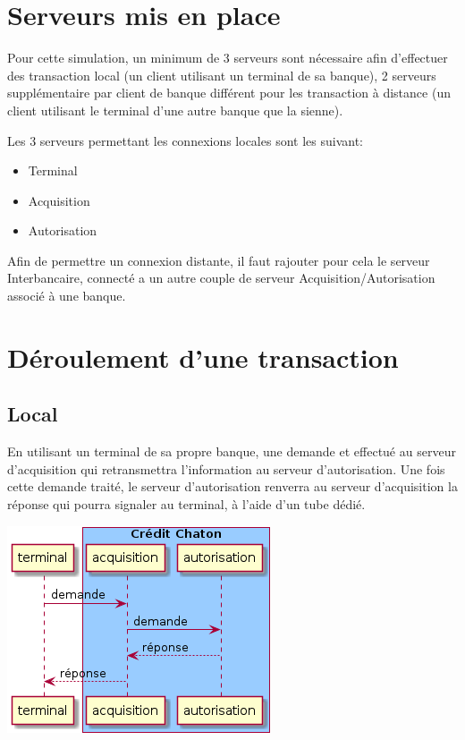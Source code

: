 \documentclass[french, a4paper, 12pt, titlepage]{article}
\begin{document}
\section{Serveurs mis en place}
Pour cette simulation, un minimum de 3 serveurs sont nécessaire afin d'effectuer des transaction local
(un client utilisant un terminal de sa banque),
2 serveurs supplémentaire par client de banque différent pour les transaction à distance (un client utilisant le terminal d'une autre banque que la sienne).

Les 3 serveurs permettant les connexions locales sont les suivant:

\begin{itemize}
	\item Terminal
	\item Acquisition
	\item Autorisation
\end{itemize}

Afin de permettre un connexion distante, il faut rajouter pour cela le serveur Interbancaire, connecté a un autre couple de serveur Acquisition/Autorisation associé à une banque.

\section{Déroulement d'une transaction}
\subsection{Local}
En utilisant un terminal de sa propre banque, une demande et effectué au serveur d'acquisition qui retransmettra l'information au serveur d'autorisation.
Une fois cette demande traité, le serveur d'autorisation renverra au serveur d'acquisition la réponse qui pourra signaler au terminal, à l'aide d'un tube dédié.
\medskip
\begin{center}
\includegraphics[scale=0.7]{transactionLocal}
\end{center}
\medskip
\end{document}
